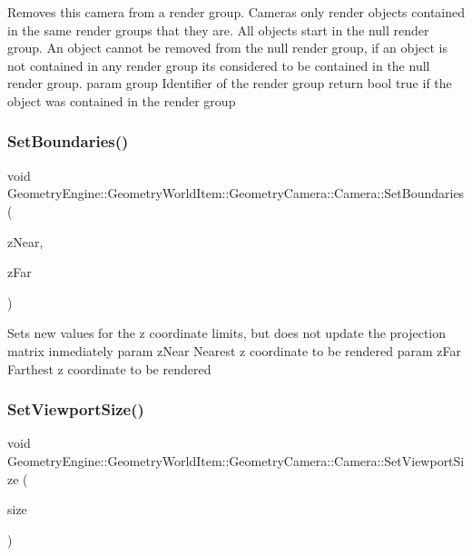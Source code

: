 Removes this camera from a render group. Cameras only render objects contained in the same render groups that they are. All objects start in the null render group. An object cannot be removed from the null render group, if an object is not contained in any render group it\textquotesingle{}s considered to be contained in the null render group. param group Identifier of the render group return bool true if the object was contained in the render group \mbox{\label{class_geometry_engine_1_1_geometry_world_item_1_1_geometry_camera_1_1_camera_acf991463c9975a3b0dd047bb73a7dc95}} 
\subsubsection{\texorpdfstring{SetBoundaries()}{SetBoundaries()}}
{\footnotesize\ttfamily void Geometry\+Engine\+::\+Geometry\+World\+Item\+::\+Geometry\+Camera\+::\+Camera\+::\+Set\+Boundaries (\begin{DoxyParamCaption}\item[{G\+Ldouble}]{z\+Near,  }\item[{G\+Ldouble}]{z\+Far }\end{DoxyParamCaption})}

Sets new values for the z coordinate limits, but does not update the projection matrix inmediately param z\+Near Nearest z coordinate to be rendered param z\+Far Farthest z coordinate to be rendered \mbox{\label{class_geometry_engine_1_1_geometry_world_item_1_1_geometry_camera_1_1_camera_a96954629a05eba955adc1dff2df1fbdb}} 
\subsubsection{\texorpdfstring{SetViewportSize()}{SetViewportSize()}}
{\footnotesize\ttfamily void Geometry\+Engine\+::\+Geometry\+World\+Item\+::\+Geometry\+Camera\+::\+Camera\+::\+Set\+Viewport\+Size (\begin{DoxyParamCaption}\item[{const Q\+Vector4D \&}]{size }\end{DoxyParamCaption})\hspace{0.3cm}{\ttfamily [virtual]}}


